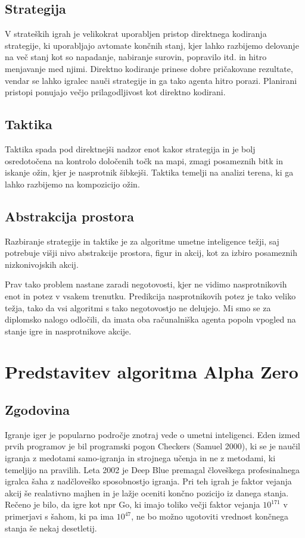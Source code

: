 \documentclass[a4paper, 12pt]{book}
\begin{document}
\section{Strategija}
V strateških igrah je velikokrat uporabljen pristop direktnega kodiranja strategije, ki uporabljajo avtomate končnih stanj, kjer lahko razbijemo delovanje na več stanj kot so napadanje, nabiranje surovin, popravilo itd. in hitro menjavanje med njimi. Direktno kodiranje prinese dobre pričakovane rezultate, vendar se lahko igralec nauči strategije in ga tako agenta hitro porazi.
Planirani pristopi ponujajo večjo prilagodljivost kot direktno kodirani.
\section{Taktika}
Taktika spada pod direktnejši nadzor enot kakor strategija in je bolj osredotočena na kontrolo določenih točk na mapi, zmagi posameznih bitk in iskanje ožin, kjer je nasprotnik šibkejši. Taktika temelji na analizi terena, ki ga lahko razbijemo na kompozicijo ožin.

\section{Abstrakcija prostora}
Razbiranje strategije in taktike je za algoritme umetne inteligence težji, saj potrebuje višji nivo abstrakcije prostora, figur in akcij, kot za izbiro posameznih nizkonivojskih akcij.

Prav tako problem nastane zaradi negotovosti, kjer ne vidimo nasprotnikovih enot in potez v vsakem trenutku. Predikcija nasprotnikovih potez je tako veliko težja, tako da vsi algoritmi s tako negotovostjo ne delujejo.
Mi smo se za diplomsko nalogo odločili, da imata oba računalniška agenta popoln vpogled na stanje igre in nasprotnikove akcije.

\chapter{Predstavitev algoritma Alpha Zero}
\label{alphazero}
\section{Zgodovina}

Igranje iger je popularno področje znotraj vede o umetni inteligenci. Eden izmed prvih programov je bil programski pogon Checkers (Samuel 2000), ki se je naučil igranja z medotami samo-igranja in strojnega učenja in ne z metodami, ki temeljijo na pravilih.
Leta 2002 je Deep Blue premagal človeškega profesinalnega igralca šaha z nadčloveško sposobnostjo igranja. Pri teh igrah je faktor vejanja akcij še realativno majhen in je lažje oceniti končno pozicijo iz danega stanja.
Rečeno je bilo, da igre kot npr Go, ki imajo toliko večji faktor vejanja $10^{171}$ v primerjavi s šahom, ki pa ima $10^{47}$, ne bo možno ugotoviti vrednost končnega stanja še nekaj desetletij.
\end{document}
